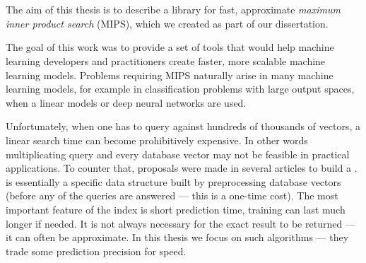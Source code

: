 \section{}

The aim of this thesis is to describe a library for fast, approximate \textit{maximum inner product search} (MIPS),
which we created as part of our dissertation.

The goal of this work was to provide a set of tools that would help machine learning developers and practitioners create faster,
more scalable machine learning models.
Problems requiring MIPS naturally arise in many machine learning models, for example in
classification problems with large output spaces, when a linear models or deep neural networks are used.

Unfortunately, when one has to query against hundreds of thousands of vectors,
a linear search time can become prohibitively expensive.
In other words multiplicating query and every database vector may not be feasible in practical applications.
To counter that, proposals were made in several articles to build a .
 is essentially a specific data structure built by preprocessing database vectors (before
any of the queries are answered --- this is a one-time cost).
The most important feature of the index is short prediction time, training can last much longer if needed.
It is not always necessary for the exact result to be returned --- it can often be approximate.
In this thesis we focus on such algorithms --- they trade some prediction precision for speed.

